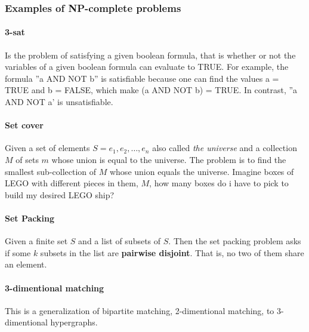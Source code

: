 \documentclass[12pt]{article} %
\begin{document}
\subsubsection{Examples of NP-complete problems}

\paragraph{3-sat}
Is the problem of satisfying a given boolean formula, that is whether or not the variables of a given boolean formula can evaluate to TRUE. For example, the formula ''a AND NOT b'' is satisfiable because one can find the values a = TRUE and b = FALSE, which make (a AND NOT b) = TRUE. In contrast, ''a AND NOT a' is unsatisfiable.

\paragraph{Set cover}
Given a set of elements $S = {e_{1}, e_{2}, \dots, e_{n}}$ also called \textit{the universe} and a collection $M$ of sets $m$ whose union is equal to the universe. The problem is to find the smallest sub-collection of $M$ whose union equals the universe. Imagine boxes of LEGO with different pieces in them, $M$, how many boxes do i have to pick to build my desired LEGO ship?

\paragraph{Set Packing}
Given a finite set $S$ and a list of subsets of $S$. Then the set packing problem asks if some $k$ subsets in the list are \textbf{pairwise disjoint}. That is, no two of them share an element. 

\paragraph{3-dimentional matching}
This is a generalization of bipartite matching, 2-dimentional matching, to 3-dimentional hypergraphs.
\end{document}

